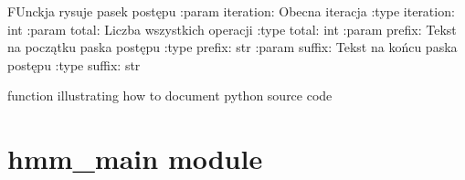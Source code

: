 \documentclass[letterpaper,10pt,polish]{sphinxmanual}
\begin{document}
\begin{fulllineitems}
\label{\detokenize{helper_file:helper_file.print_progress_bar}}
FUnckja rysuje pasek postępu
:param iteration: Obecna iteracja
:type iteration: int
:param total: Liczba wszystkich operacji
:type total: int
:param prefix: Tekst na początku paska postępu
:type prefix: str
:param suffix: Tekst na końcu paska postępu
:type suffix: str

\end{fulllineitems}


\begin{fulllineitems}
\label{\detokenize{helper_file:helper_file.print_summary}}
function illustrating how to document python source code

\end{fulllineitems}



\section{hmm\_main module}
\label{\detokenize{hmm_main:hmm-main-module}}\label{\detokenize{hmm_main::doc}}\label{\detokenize{hmm_main:module-hmm_main}}
\end{document}
